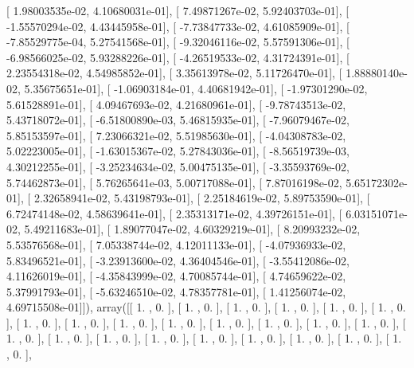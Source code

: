 \documentclass{article}
\begin{document}
       [  1.98003535e-02,   4.10680031e-01],
       [  7.49871267e-02,   5.92403703e-01],
       [ -1.55570294e-02,   4.43445958e-01],
       [ -7.73847733e-02,   4.61085909e-01],
       [ -7.85529775e-04,   5.27541568e-01],
       [ -9.32046116e-02,   5.57591306e-01],
       [ -6.98566025e-02,   5.93288226e-01],
       [ -4.26519533e-02,   4.31724391e-01],
       [  2.23554318e-02,   4.54985852e-01],
       [  3.35613978e-02,   5.11726470e-01],
       [  1.88880140e-02,   5.35675651e-01],
       [ -1.06903184e-01,   4.40681942e-01],
       [ -1.97301290e-02,   5.61528891e-01],
       [  4.09467693e-02,   4.21680961e-01],
       [ -9.78743513e-02,   5.43718072e-01],
       [ -6.51800890e-03,   5.46815935e-01],
       [ -7.96079467e-02,   5.85153597e-01],
       [  7.23066321e-02,   5.51985630e-01],
       [ -4.04308783e-02,   5.02223005e-01],
       [ -1.63015367e-02,   5.27843036e-01],
       [ -8.56519739e-03,   4.30212255e-01],
       [ -3.25234634e-02,   5.00475135e-01],
       [ -3.35593769e-02,   5.74462873e-01],
       [  5.76265641e-03,   5.00717088e-01],
       [  7.87016198e-02,   5.65172302e-01],
       [  2.32658941e-02,   5.43198793e-01],
       [  2.25184619e-02,   5.89753590e-01],
       [  6.72474148e-02,   4.58639641e-01],
       [  2.35313171e-02,   4.39726151e-01],
       [  6.03151071e-02,   5.49211683e-01],
       [  1.89077047e-02,   4.60329219e-01],
       [  8.20993232e-02,   5.53576568e-01],
       [  7.05338744e-02,   4.12011133e-01],
       [ -4.07936933e-02,   5.83496521e-01],
       [ -3.23913600e-02,   4.36404546e-01],
       [ -3.55412086e-02,   4.11626019e-01],
       [ -4.35843999e-02,   4.70085744e-01],
       [  4.74659622e-02,   5.37991793e-01],
       [ -5.63246510e-02,   4.78357781e-01],
       [  1.41256074e-02,   4.69715508e-01]]), array([[ 1.        ,  0.        ],
       [ 1.        ,  0.        ],
       [ 1.        ,  0.        ],
       [ 1.        ,  0.        ],
       [ 1.        ,  0.        ],
       [ 1.        ,  0.        ],
       [ 1.        ,  0.        ],
       [ 1.        ,  0.        ],
       [ 1.        ,  0.        ],
       [ 1.        ,  0.        ],
       [ 1.        ,  0.        ],
       [ 1.        ,  0.        ],
       [ 1.        ,  0.        ],
       [ 1.        ,  0.        ],
       [ 1.        ,  0.        ],
       [ 1.        ,  0.        ],
       [ 1.        ,  0.        ],
       [ 1.        ,  0.        ],
       [ 1.        ,  0.        ],
       [ 1.        ,  0.        ],
       [ 1.        ,  0.        ],
       [ 1.        ,  0.        ],
       [ 1.        ,  0.        ],
\end{document}
